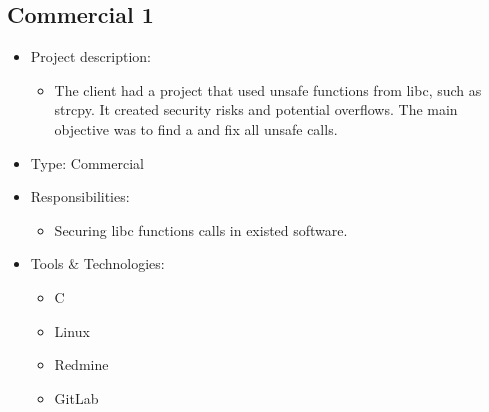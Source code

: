 \hypertarget{proj_com1}{\subsection{Commercial 1}}
\begin{itemize}
    \item Project description:
    \begin{itemize}
        \item The client had a project that used unsafe functions from libc, such as strcpy. It
              created security risks and potential overflows. The main objective was to find
              a and fix all unsafe calls.
    \end{itemize}
    \item Type: Commercial
    \item Responsibilities:
    \begin{itemize}
        \item Securing libc functions calls in existed software.
    \end{itemize}
    \item Tools \& Technologies:
    \begin{itemize}
        \item C
        \item Linux
        \item Redmine
        \item GitLab
    \end{itemize}
\end{itemize}
\newpage
